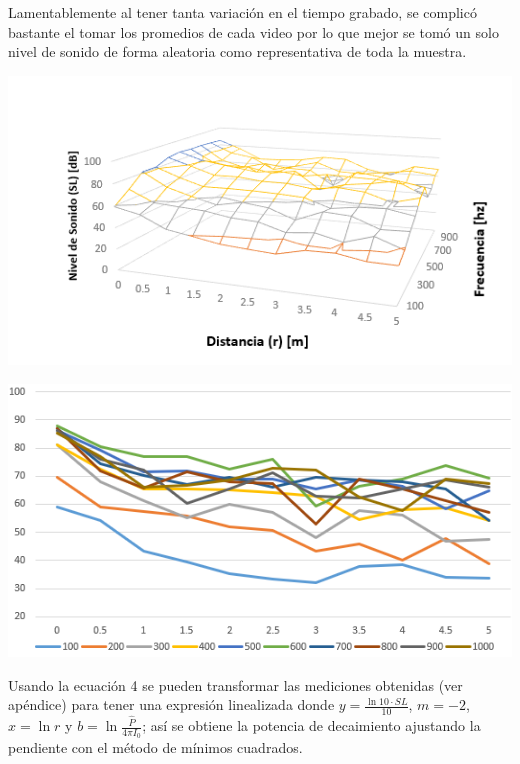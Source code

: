\documentclass[DIV=calc, paper=a4, fontsize=11pt]{scrartcl}
\newenvironment{Figura}
  {\par\medskip\noindent\minipage{\linewidth}}
  {\endminipage\par\medskip}
\begin{document}
\begin{multicols}{2}
Lamentablemente al tener tanta variación en el tiempo grabado, se complicó bastante el tomar los promedios de cada video por lo que mejor se tomó un solo nivel de sonido de forma aleatoria como representativa de toda la muestra.

\begin{Figura}
\centering
    \includegraphics[width=1\textwidth]{grafica sonido 1.PNG}
    \label{fig}
\end{Figura}

\begin{Figura}
\centering
    \includegraphics[width=1\textwidth]{grafica sonido 2.PNG}
    \label{fig}
\end{Figura}



Usando la ecuación 4 se pueden transformar las mediciones obtenidas (ver apéndice) para tener una expresión linealizada donde $y = \frac{\ln{10} \cdot SL}{10}$, $m=-2$, $x= \ln{r}$ y $b= \ln{\frac{\hat{P}}{4\pi I_0}}$; así se obtiene la potencia de decaimiento ajustando la pendiente con el método de mínimos cuadrados.


\end{multicols}
\end{document}

